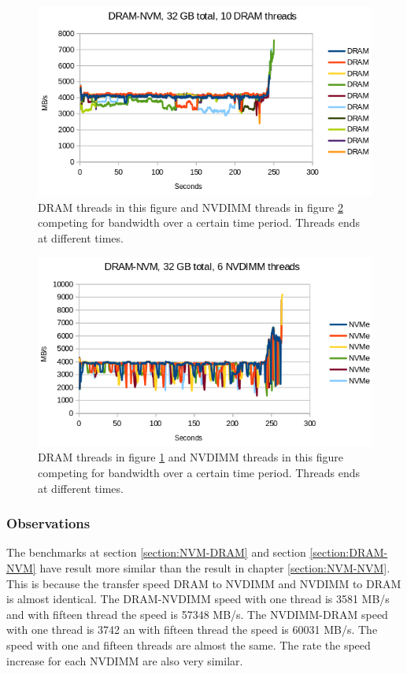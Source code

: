 \documentclass[12pt,a4paper,USenglish]{article}      %
\begin{document}
\begin{figure}[!hbtp]
\includegraphics[scale=0.7]{Benchmarks/DRAM-NVM_32GB_10_DRAM_Threads.png}
\caption{DRAM threads in this figure and NVDIMM threads in figure \ref{fig:DRAM_NVM_sec2} competing for bandwidth over a certain time period. Threads ends at different times.}
\label{fig:DRAM_NVM_sec1}
\end{figure}

\begin{figure}[!hbtp]
\includegraphics[scale=0.7]{Benchmarks/DRAM-NVM_32GB_6_NVDIMM_Threads.png}
\caption{DRAM threads in figure \ref{fig:DRAM_NVM_sec1} and NVDIMM threads in this figure competing for bandwidth over a certain time period. Threads ends at different times.}
\label{fig:DRAM_NVM_sec2}
\end{figure}

\pagebreak
\subsubsection{Observations}
\label{section:Observations}
The benchmarks at section \ref{section:NVM-DRAM} and section \ref{section:DRAM-NVM} have result more similar than the result in chapter \ref{section:NVM-NVM}. This is because the transfer speed DRAM to NVDIMM and NVDIMM to DRAM is almost identical. The DRAM-NVDIMM speed with one thread is 3581 MB/s and with fifteen thread the speed is 57348 MB/s. The NVDIMM-DRAM speed with one thread is 3742 an with fifteen thread the speed is 60031 MB/s. The speed with one and fifteen threads are almost the same. The rate the speed increase for each NVDIMM are also very similar.
\end{document}
